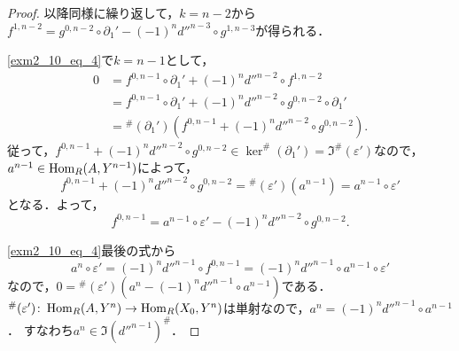 \begin{proof}
  以降同様に繰り返して，$k=n-2$から$f^{1, n-2} = g^{0, n-2} \circ \partial_1' - (-1)^n d''^{n-3} \circ g^{1, n-3}$が得られる．

  \eqref{exm2_10_eq_4}で$k=n-1$として，
  \begin{align*}
    0 & = f^{0, n-1} \circ \partial_{1}' + (-1)^n d''^{n-2} \circ f^{1, n-2} \\
    & = f^{0, n-1} \circ \partial_{1}' + (-1)^n d''^{n-2} \circ g^{0, n-2} \circ \partial_1' \\
    & = {}^\#(\partial_1') \left( f^{0, n-1} + (-1)^n d''^{n-2} \circ g^{0, n-2} \right).
  \end{align*}
  従って，$f^{0, n-1} + (-1)^n d''^{n-2} \circ g^{0, n-2} \in \ker ^\#(\partial_{1}') = \Im ^\#(\varepsilon')$なので，$a^{n-1} \in \operatorname{Hom}_R(A, Y^{n-1})$によって，
  \[ f^{0, n-1} + (-1)^n d''^{n-2} \circ g^{0, n-2} = {}^\#(\varepsilon')(a^{n-1}) = a^{n-1} \circ \varepsilon' \]
  となる．よって，
  \[ f^{0, n-1} = a^{n-1} \circ \varepsilon' - (-1)^n d''^{n-2} \circ g^{0, n-2}. \]

  \eqref{exm2_10_eq_4}最後の式から
  \[ a^n \circ \varepsilon' = (-1)^n d''^{n-1} \circ f^{0, n-1} = (-1)^n d''^{n-1} \circ a^{n-1} \circ \varepsilon' \]
  なので，$0 = {}^\# (\varepsilon') \left( a^n - (-1)^n d''^{n-1} \circ a^{n-1} \right)$である．
  $^\# (\varepsilon') \colon \operatorname{Hom}_R(A, Y^n) \to \operatorname{Hom}_R(X_0, Y^n)$は単射なので，$a^n = (-1)^n d''^{n-1} \circ a^{n-1}$．
  すなわち$a^n \in \Im (d''^{n-1})^\# $．
\end{proof}


